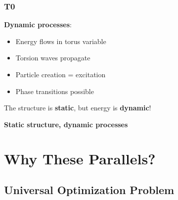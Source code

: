 	\subsubsection{T0}
	
	\textbf{Dynamic processes}:
	\begin{itemize}
		\item Energy flows in torus variable
		\item Torsion waves propagate
		\item Particle creation = excitation
		\item Phase transitions possible
	\end{itemize}
	
	The structure is \textbf{static}, but energy is \textbf{dynamic}!
	
	\begin{keyresult}
		\textbf{Static structure, dynamic processes}
		
		\vspace{0.3cm}
		
		\begin{center}
		\end{center}
	\end{keyresult}
	
	\section{Why These Parallels?}
	
	\subsection{Universal Optimization Problem}
	
